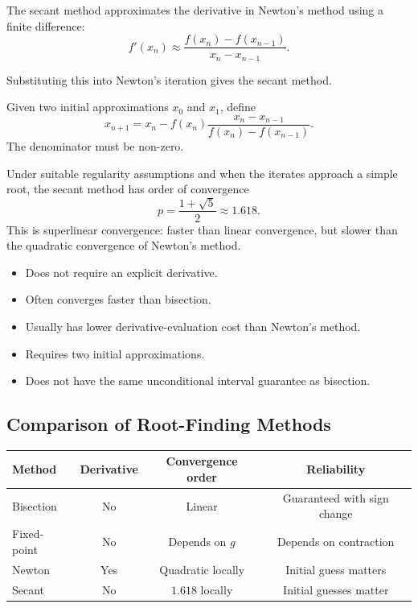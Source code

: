 The secant method approximates the derivative in Newton's method using a finite difference:
\[
  f'(x_n)\approx
  \frac{f(x_n)-f(x_{n-1})}{x_n-x_{n-1}}.
\]

Substituting this into Newton's iteration gives the secant method.

\begin{definition}
  Given two initial approximations \(x_0\) and \(x_1\), define
  \[
    \boxed{
      x_{n+1}
      =x_n-
      f(x_n)\frac{x_n-x_{n-1}}{f(x_n)-f(x_{n-1})}.
    }
  \]
  The denominator must be non-zero.
\end{definition}

\begin{remark}[Convergence]
  Under suitable regularity assumptions and when the iterates approach a simple root, the secant method has order of convergence
  \[
    \boxed{
      p=\frac{1+\sqrt{5}}{2}\approx1.618.
    }
  \]
  This is superlinear convergence: faster than linear convergence, but slower than the quadratic convergence of Newton's method.
\end{remark}

\begin{remark}
  \begin{itemize} \emph{}
    \item Does not require an explicit derivative.
    \item Often converges faster than bisection.
    \item Usually has lower derivative-evaluation cost than Newton's method.
    \item Requires two initial approximations.
    \item Does not have the same unconditional interval guarantee as bisection.
  \end{itemize}
\end{remark}

\subsection{Comparison of Root-Finding Methods}

\begin{center}
  \begin{tabular}{|l|c|c|c|}
    \hline
    \textbf{Method} & \textbf{Derivative} &
    \textbf{Convergence order} & \textbf{Reliability}\\
    \hline
    Bisection & No & Linear & Guaranteed with sign change\\
    Fixed-point & No & Depends on \(g\) & Depends on contraction\\
    Newton & Yes & Quadratic locally & Initial guess matters\\
    Secant & No & \(1.618\) locally & Initial guesses matter\\
    \hline
  \end{tabular}
\end{center}

